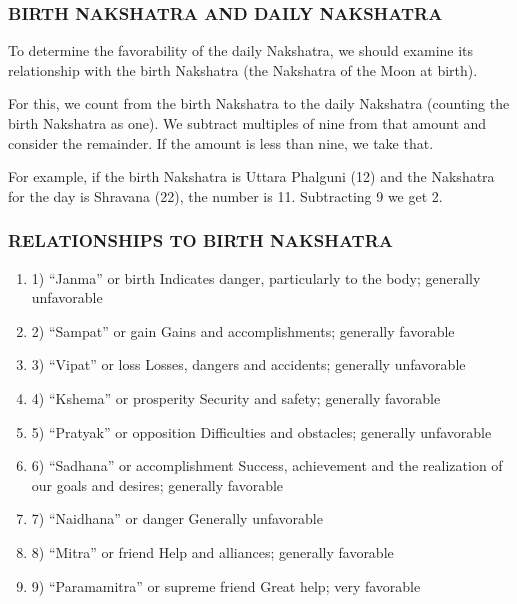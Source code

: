  

\subsubsection{BIRTH NAKSHATRA AND DAILY NAKSHATRA}
 

To determine the favorability of the daily Nakshatra, we should examine its relationship with the birth Nakshatra (the Nakshatra of the Moon at birth).

For this, we count from the birth Nakshatra to the daily Nakshatra (counting the birth Nakshatra as one). We subtract multiples of nine from that amount and consider the remainder. If the amount is less than nine, we take that.

For example, if the birth Nakshatra is Uttara Phalguni (12) and the Nakshatra for the day is Shravana (22), the number is 11. Subtracting 9 we get 2.

 

\subsubsection{RELATIONSHIPS TO BIRTH NAKSHATRA}

 \begin{enumerate}

\item[] 1) “Janma” or birth	Indicates danger, particularly to the body; generally unfavorable
 

\item[] 2) “Sampat” or gain	Gains and accomplishments; generally favorable
 

\item[] 3) “Vipat” or loss	Losses, dangers and accidents; generally unfavorable
 

\item[] 4) “Kshema” or prosperity	Security and safety; generally favorable
 

\item[] 5) “Pratyak” or opposition	Difficulties and obstacles; generally unfavorable
 

\item[] 6) “Sadhana” or accomplishment	Success, achievement and the realization of our goals and desires; generally favorable
 

\item[] 7) “Naidhana” or danger	Generally unfavorable
 

\item[] 8) “Mitra” or friend	Help and alliances; generally favorable
 

 

\item[] 9) “Paramamitra” or supreme friend	Great help; very favorable
 
\end{enumerate}
 

